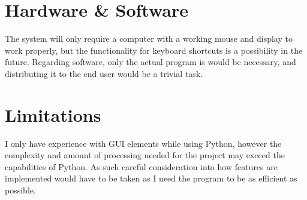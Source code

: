 \section{Hardware \& Software}
    The system will only require a computer with a working mouse and display to work properly, but the functionality for keyboard shortcuts is a possibility in the future. 
    Regarding software, only the actual program is would be necessary, and distributing it to the end user would be a trivial task.

\section{Limitations}
    I only have experience with GUI elements while using Python, however the complexity and amount of processing needed for the project may exceed the capabilities of Python. 
    As such careful consideration into how features are implemented would have to be taken as I need the program to be as efficient as possible. 

